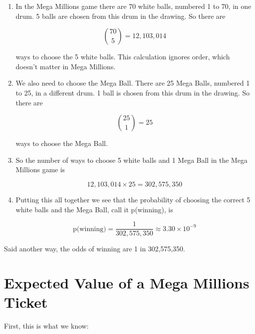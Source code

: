 \documentclass{article}
\theoremstyle{definition}
\begin{document}
\smallskip
\begin{enumerate}
\item In the Mega Millions game there are 70 white balls,
numbered 1 to 70, in one drum. 5 balls are chosen from this drum
in the drawing. So there are

\begin{equation*}
       \binom{70}{5} = 12,103,014 
\end{equation*}

\bigskip
\noindent
ways to choose the 5 white balls. This calculation ignores order,
which doesn't matter in Mega Millions.

\item We also need to choose the Mega Ball. There are 25 Mega
Balls, numbered 1 to 25, in a different drum. 1 ball is chosen
from this drum in the drawing.  So there are

\smallskip
\begin{equation*}
       \binom{25}{1} = 25 
\end{equation*}

\medskip
\noindent
ways to choose the Mega Ball.

\item So the number of ways to choose 5 white balls and 1 Mega
Ball in the Mega Millions game is
 
\begin{equation*}
       12,103,014 \times 25 = 302,575,350
\end{equation*}

\smallskip
\item Putting this all together we see that the probability of
choosing the correct 5 white balls and the Mega Ball, call it
p(winning), is

\begin{equation*}
       \text{p(winning)} = \dfrac{1}{302,575,350} \approx 3.30 \times 10^{-9}
\end{equation*}
\end{enumerate}

\bigskip
\noindent
Said another way, the odds of winning are 1 in 302,575,350. 


\section{Expected Value of a Mega Millions Ticket}
\label{section:expected_value_of_a_ticket}
First, this is what we know:
\end{document}
